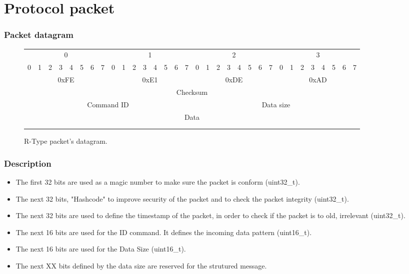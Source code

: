 \documentclass[a4 paper, 12pt]{report}
\begin{document}
\chapter{Protocol packet}

\subsection*{Packet datagram}

\begin{figure}[!Hh]
  \centering
  \begin{tabular}{p{0.1cm}p{0.1cm}p{0.1cm}p{0.1cm}p{0.1cm}p{0.1cm}p{0.1cm}p{0.1cm}p{0.1cm}p{0.1cm}p{0.1cm}p{0.1cm}p{0.1cm}p{0.1cm}p{0.1cm}p{0.1cm}p{0.1cm}p{0.1cm}p{0.1cm}p{0.1cm}p{0.1cm}p{0.1cm}p{0.1cm}p{0.1cm}p{0.1cm}p{0.1cm}p{0.1cm}p{0.1cm}p{0.1cm}p{0.1cm}p{0.1cm}p{0.1cm}}
    \multicolumn{8}{c}{0} & \multicolumn{8}{c}{1} & \multicolumn{8}{c}{2} & \multicolumn{8}{c}{3}\\
    0 & 1 & 2 & 3 & 4 & 5 & 6 & 7 & 0 & 1 & 2 & 3 & 4 & 5 & 6 & 7 & 0 & 1 & 2 & 3 & 4 & 5 & 6 & 7 & 0 & 1 & 2 & 3 & 4 & 5 & 6 & 7\\
    \hline
    \multicolumn{8}{|c|}{0xFE} & \multicolumn{8}{c|}{0xE1} & \multicolumn{8}{c|}{0xDE} & \multicolumn{8}{c|}{0xAD}\\
    \hline
    \multicolumn{32}{|c|}{Checksum}\\
    \hline
    \multicolumn{16}{|c|}{Command ID} & \multicolumn{16}{c|}{Data size}\\
    \hline
    \multicolumn{32}{|c|}{Data}\\
    \multicolumn{32}{|c|}{}\\
    \hdashline
  \end{tabular}
  \caption{R-Type packet's datagram.}
\end{figure}

\subsection*{Description}

\begin{itemize}
\item The first 32 bits are used as a magic number to make sure the packet is conform (uint32\_t).
\item The next 32 bits, "Hashcode" to improve security of the packet and to check the packet integrity (uint32\_t).
\item The next 32 bits are used to define the timestamp of the packet, in order to check if the packet is to old, irrelevant (uint32\_t).
\item The next 16 bits are used for the ID command. It defines the incoming data pattern (uint16\_t).
\item The next 16 bits are used for the Data Size (uint16\_t).
\item The next XX bits defined by the data size are reserved for the strutured message.
\end{itemize}
\end{document}
